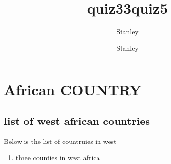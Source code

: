 \documentclass[10pt,a4paper]{article}
\author{Stanley}
\title{quiz33}
\author{Stanley}
\title{quiz5}
\begin{document}
\maketitle
\section{African COUNTRY}
\subsection{list of west african countries}
Below is the list of countruies in west 
\begin{enumerate}
\item three counties in west africa
\end{enumerate}
\end{document}
